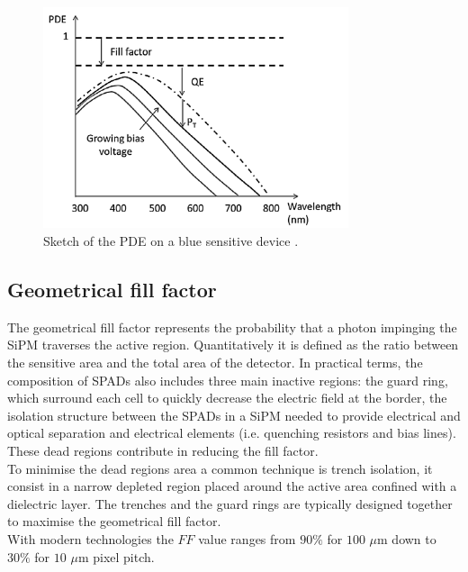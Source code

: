 \begin{figure}
	\centering
	\includegraphics[width=0.8\textwidth]{IMG/Cap3/PDE.png}
	\caption{Sketch of the PDE on a blue sensitive device \cite{electrics}.}
	\label{fig:PDE}
\end{figure}

\subsection*{Geometrical fill factor}
The geometrical fill factor represents the probability that a photon impinging the SiPM traverses the active region. Quantitatively it is defined as the ratio between the sensitive area and the total area of the detector. In practical terms, the composition of SPADs also includes three main inactive regions: the guard ring, which surround each cell to quickly decrease the electric field at the border, the isolation structure between the SPADs in a SiPM needed to provide electrical and optical separation and electrical elements (i.e. quenching resistors and bias lines). 
These dead regions contribute in reducing the fill factor.\\
To minimise the dead regions area a common technique is trench isolation, it consist in a narrow depleted region placed around the active area confined with a dielectric layer. The trenches and the guard rings are typically designed together to maximise the geometrical fill factor.\\
With modern technologies the $FF$ value ranges from $90\%$ for $100$ $\mu$m down to $30\%$ for $10$ $\mu$m pixel pitch.

